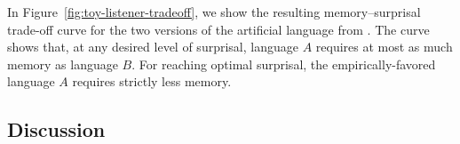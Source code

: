 In Figure~\ref{fig:toy-listener-tradeoff}, we show the resulting memory--surprisal trade-off curve for the two versions of the artificial language from \cite{fedzechkina-human-2017}. %
The curve shows that, at any desired level of surprisal, language $A$ requires at most as much memory as language $B$.
For reaching optimal surprisal, the empirically-favored language $A$ requires strictly less memory.







%
%
%
%
%
%
%
%
%
%
%




\subsection{Discussion}

